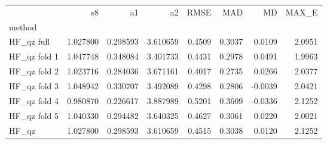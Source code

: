 \begin{tabular}{lrrrrrrr}
 & s8 & a1 & a2 & RMSE & MAD & MD & MAX_E \\
method &  &  &  &  &  &  &  \\
HF_qz full & 1.027800 & 0.298593 & 3.610659 & 0.4509 & 0.3037 & 0.0109 & 2.0951 \\
HF_qz fold 1 & 1.047748 & 0.348084 & 3.401733 & 0.4431 & 0.2978 & 0.0491 & 1.9963 \\
HF_qz fold 2 & 1.023716 & 0.284036 & 3.671161 & 0.4017 & 0.2735 & 0.0266 & 2.0377 \\
HF_qz fold 3 & 1.048942 & 0.330707 & 3.492089 & 0.4298 & 0.2806 & -0.0039 & 2.0421 \\
HF_qz fold 4 & 0.980870 & 0.226617 & 3.887989 & 0.5201 & 0.3609 & -0.0336 & 2.1252 \\
HF_qz fold 5 & 1.040330 & 0.294482 & 3.640325 & 0.4627 & 0.3061 & 0.0220 & 2.0021 \\
HF_qz & 1.027800 & 0.298593 & 3.610659 & 0.4515 & 0.3038 & 0.0120 & 2.1252 \\
\end{tabular}
